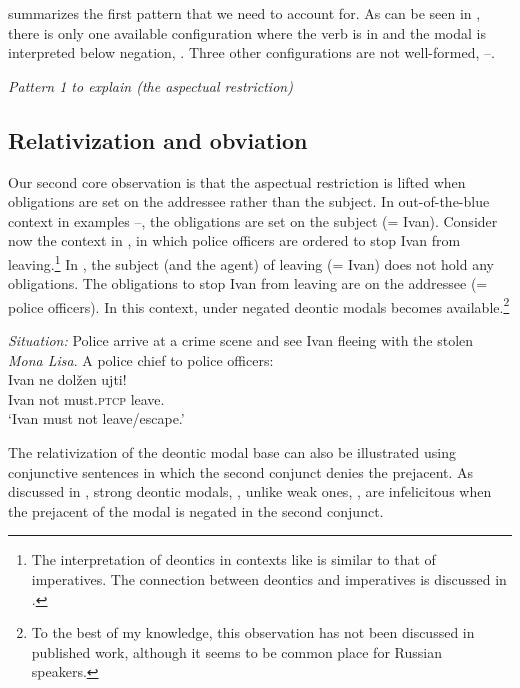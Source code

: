 \documentclass[output=paper,
modfonts,
newtxmath,colorlinks,citecolor=brown
]{langscibook}
\begin{document}
\noindent {} summarizes the first pattern that we need to account for. As can be seen in , there is only one available configuration where the verb is in \im and the modal is interpreted below negation, . Three other configurations are not well-formed, --. 

	\ea \textit{Pattern 1 to explain (the aspectual restriction)}\label{p11}
	\ea[\ding{51}]{$\neg \ \Box$ \im \label{p11a}}
    \ex[\ding{55}]{$\,\Box\ \neg$ \im \label{p11b}}
    \ex[\ding{55}]{$\,\neg \ \Box$ \p \label{p11c}}
    \ex[\ding{55}]{$\,\Box\ \neg$ \p \label{p11d}}
    \z\z


 \subsection{Relativization and obviation}
 Our second core observation is that the aspectual restriction is lifted when obligations are set on the addressee rather than the subject. In out-of-the-blue context in examples --, the obligations are set on the subject (= Ivan). Consider now the context in , in which police officers are ordered to stop Ivan from leaving.\footnote{The interpretation of deontics in contexts like  is similar to that of imperatives. The connection between deontics and imperatives is discussed in .
 }
 In , the subject (and the agent) of leaving (= Ivan) does not hold any obligations. The obligations to stop Ivan from leaving are on the addressee (= police officers). In this context, \p under negated deontic modals becomes available.\footnote{To the best of my knowledge, this observation has not been discussed in published work, although it seems to be common place for Russian speakers.
 }
 


\ea \label{relat} \textit{Situation:} Police arrive at a crime scene and see Ivan fleeing with the stolen \emph{Mona Lisa}. A police chief to police officers:\\[5pt]
	{\gll  Ivan ne dolžen ujti!\\
	Ivan  not must.\textsc{ptcp} leave.\p \\
	\glt `Ivan must not leave/escape.'}
	\z 
        
\noindent The relativization of the deontic modal base can also be illustrated using conjunctive sentences in which the second conjunct denies the prejacent. As discussed in \citet{nin05}, strong deontic modals, , unlike weak ones, , are infelicitous when the prejacent of the modal is negated in the second conjunct. 
\end{document}

